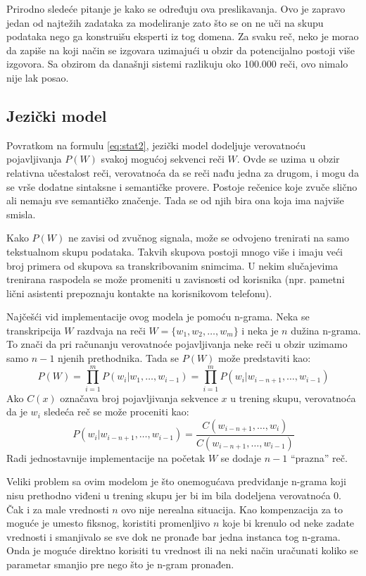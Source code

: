 \documentclass[a4paper]{article}
\begin{document}
Prirodno sledeće pitanje je kako se određuju ova preslikavanja. 
Ovo je zapravo jedan od najtežih zadataka za modeliranje zato što se on ne uči na skupu podataka nego ga konstruišu eksperti iz tog domena.
Za svaku reč, neko je morao da zapiše na koji način se izgovara uzimajući u obzir da potencijalno postoji više izgovora.
Sa obzirom da današnji sistemi razlikuju oko 100.000 reči, ovo nimalo nije lak posao.

\subsection{Jezički model}
Povratkom na formulu \ref{eq:stat2}, jezički model dodeljuje verovatnoću pojavljivanja $P(W)$ svakoj mogućoj sekvenci reči $W$.
Ovde se uzima u obzir relativna učestalost reči, verovatnoća da se reči nađu jedna za drugom, i mogu da se vrše dodatne sintaksne i semantičke provere.
Postoje rečenice koje zvuče slično ali nemaju sve semantičko značenje.
Tada se od njih bira ona koja ima najviše smisla.

Kako $P(W)$ ne zavisi od zvučnog signala, može se odvojeno trenirati na samo tekstualnom skupu podataka. Takvih skupova postoji mnogo više i imaju veći broj primera od skupova sa transkribovanim snimcima.
U nekim slučajevima trenirana raspodela se može promeniti u zavisnosti od korisnika (npr. pametni lični asistenti prepoznaju kontakte na korisnikovom telefonu).

Najčešći vid implementacije ovog modela je pomoću n-grama.
Neka se transkripcija $W$ razdvaja na reči $W = \{w_1, w_2, \dots, w_m\}$ i neka je $n$ dužina n-grama.
To znači da pri računanju verovatnoće pojavljivanja neke reči u obzir uzimamo samo $n-1$ njenih prethodnika.
Tada se $P(W)$ može predstaviti kao:
\begin{equation*}
  P(W) = \prod_{i=1}^{m} P(w_i | w_1,\dots,w_{i-1}) = \prod_{i=1}^{m} P(w_i | w_{i-n+1},\dots,w_{i-1})
\end{equation*}
Ako $C(x)$ označava broj pojavljivanja sekvence $x$ u trening skupu, verovatnoća da je $w_i$ sledeća reč se može proceniti kao:
\begin{equation*}
  P(w_i | w_{i-n+1},\dots,w_{i-1}) = \frac{C(w_{i-n+1},\dots,w_i)}{C(w_{i-n+1},\dots,w_{i-1})}
\end{equation*}
Radi jednostavnije implementacije na početak $W$ se dodaje $n-1$ ``prazna'' reč.

Veliki problem sa ovim modelom je što onemogućava predviđanje n-grama koji nisu prethodno viđeni u trening skupu jer bi im bila dodeljena verovatnoća 0.
Čak i za male vrednosti $n$ ovo nije nerealna situacija.
Kao kompenzacija za to moguće je umesto fiksnog, koristiti promenljivo $n$ koje bi krenulo od neke zadate vrednosti i smanjivalo se sve dok ne pronađe bar jedna instanca tog n-grama.
Onda je moguće direktno korisiti tu vrednost ili na neki način uračunati koliko se parametar smanjio pre nego što je n-gram pronađen.
\end{document}
